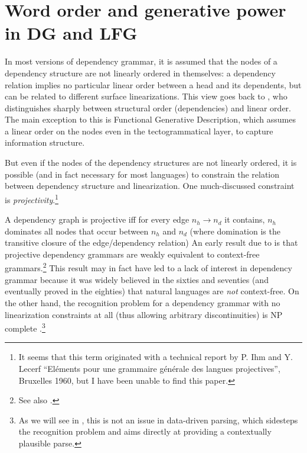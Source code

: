 \documentclass[output=paper,hidelinks]{langscibook}
\begin{document}
\section{Word order and generative power in DG and LFG}\label{sec:Dependency:wordorder}
In most versions of dependency grammar, it is assumed that the nodes
of a dependency structure are not linearly ordered in themselves: a dependency relation implies no particular linear order between a head and its dependents, but
can be related to different surface linearizations. This view goes
back to \citet[chapter 7]{Tesniere1959}, who distinguishes sharply
between structural order (dependencies) and linear order. The main
exception to this is Functional Generative Description, which assumes
a linear order on the nodes even in the tectogrammatical layer, to
capture information structure.

But even if the nodes of the dependency structures are not linearly
ordered, it is possible (and in fact necessary for most languages) to
constrain the relation between dependency structure and
linearization. One much-discussed constraint is \emph{projectivity}.\footnote{It seems that this term originated with a technical report by P. Ihm and Y. Lecerf ``Eléments pour une grammaire générale des langues projectives'', Bruxelles 1960, but I have been unable to find this paper.}

\ea\label{def:projectivity} A dependency graph is projective iff for every edge $n_h
\rightarrow n_d$ it contains, $n_h$ dominates all nodes that occur
between $n_h$ and $n_d$ (where domination is the transitive closure of
the edge/dependency relation)
\z
%
An early result due to \citet{Gaifman1965} is that projective
dependency grammars are weakly equivalent to context-free
grammars.\footnote{See also \citet{Hays1964}.} This result may in fact
have led to a lack of interest in dependency grammar because it was
widely believed in the sixties and seventies (and eventually proved in
the eighties) that natural languages are \emph{not} context-free. On
the other hand, the recognition problem for a dependency grammar with
no linearization constraints at all (thus allowing arbitrary
discontinuities) is NP complete \citep{NeuhausBroeker97}.\footnote{As
we will see in , this is not an issue
in data-driven parsing, which sidesteps the recognition problem and
aims directly at providing a contextually plausible parse.}
\end{document}

